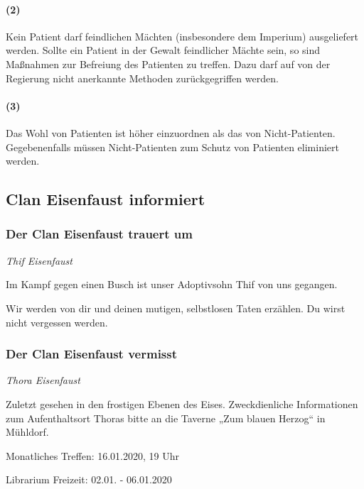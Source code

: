 \documentclass[final]{multiversum}
\begin{document}
\paragraph{(2)} Kein Patient darf feindlichen Mächten (insbesondere dem Imperium) ausgeliefert werden. Sollte ein Patient in der Gewalt feindlicher Mächte sein, so sind Maßnahmen zur Befreiung des Patienten zu treffen. Dazu darf auf von der Regierung nicht anerkannte Methoden zurückgegriffen werden.
\paragraph{(3)} Das Wohl von Patienten ist höher einzuordnen als das von Nicht-Patienten. Gegebenenfalls müssen Nicht-Patienten zum Schutz von Patienten eliminiert werden.


\subsection{Clan Eisenfaust informiert}
\subsubsection{Der Clan Eisenfaust trauert um}

\begin{center}
  \textit{Thif Eisenfaust}
\end{center}

Im Kampf gegen einen Busch ist unser Adoptivsohn Thif von uns gegangen.

Wir werden von dir und deinen mutigen, selbstlosen Taten erzählen.
Du wirst nicht vergessen werden.

\subsubsection{Der Clan Eisenfaust vermisst}

\begin{center}
  \textit{Thora Eisenfaust}
\end{center}

Zuletzt gesehen in den frostigen Ebenen des Eises.
Zweckdienliche Informationen zum Aufenthaltsort Thoras bitte an die Taverne „Zum blauen Herzog“ in Mühldorf.




\begin{termine}
  \item Monatliches Treffen: 16.01.2020, 19 Uhr
  \item Librarium Freizeit: 02.01. - 06.01.2020
\end{termine}

\impressum
\end{document}
